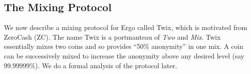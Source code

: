 \documentclass[11pt]{article}
\newcommand{\mixname}{Twix\xspace}
\begin{document}
%
%
%


\subsection{The Mixing Protocol}

We now describe a mixing protocol for Ergo called \mixname, which is motivated from ZeroCash (ZC). 
The name \mixname is a portmanteau of {\em Two} and {\em Mix}. 
\mixname essentially mixes two coins and so provides ``50\% anonymity'' in one mix. A coin can be successively mixed to increase the anonymity above any desired level (say 99.99999\%). We do a formal analysis of the protocol later. 
\end{document}

